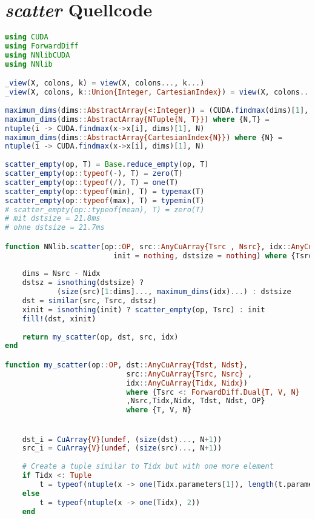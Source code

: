 \section{\textit{scatter} Quellcode}
\label{code_subfig}
\lstset{language=Julia,style=nonumbers}
\begin{lstlisting}[language=Julia]
using CUDA
using ForwardDiff
using NNlibCUDA
using NNlib

_view(X, colons, k) = view(X, colons..., k...)
_view(X, colons, k::Union{Integer, CartesianIndex}) = view(X, colons..., k)
 
maximum_dims(dims::AbstractArray{<:Integer}) = (CUDA.findmax(dims)[1], )
maximum_dims(dims::AbstractArray{NTuple{N, T}}) where {N,T} = 
ntuple(i -> CUDA.findmax(x->x[i], dims)[1], N)
maximum_dims(dims::AbstractArray{CartesianIndex{N}}) where {N} = 
ntuple(i -> CUDA.findmax(x->x[i], dims)[1], N)
 
scatter_empty(op, T) = Base.reduce_empty(op, T)
scatter_empty(op::typeof(-), T) = zero(T)
scatter_empty(op::typeof(/), T) = one(T)
scatter_empty(op::typeof(min), T) = typemax(T)
scatter_empty(op::typeof(max), T) = typemin(T)
# scatter_empty(op::typeof(mean), T) = zero(T)
# mit dstsize = 21.8ms
# ohne dstsize = 21.7ms

function NNlib.scatter(op::OP, src::AnyCuArray{Tsrc , Nsrc}, idx::AnyCuArray{Tidx, Nidx}; 
                         init = nothing, dstsize = nothing) where {Tsrc <: ForwardDiff.Dual{T, V, N},Tidx,Nsrc,Nidx,OP} where {T, V, N}
    
    dims = Nsrc - Nidx 
    dstsz = isnothing(dstsize) ? 
            (size(src)[1:dims]..., maximum_dims(idx)...) : dstsize 
    dst = similar(src, Tsrc, dstsz) 
    xinit = isnothing(init) ? scatter_empty(op, Tsrc) : init  
    fill!(dst, xinit) 
    
    return my_scatter(op, dst, src, idx)        
end

function my_scatter(op::OP, dst::AnyCuArray{Tdst, Ndst}, 
                            src::AnyCuArray{Tsrc, Nsrc} , 
                            idx::AnyCuArray{Tidx, Nidx}) 
                            where {Tsrc <: ForwardDiff.Dual{T, V, N}
                            ,Nsrc,Tidx,Nidx, Tdst, Ndst, OP} 
                            where {T, V, N}   


    dst_i = CuArray{V}(undef, (size(dst)..., N+1)) 
    src_i = CuArray{V}(undef, (size(src)..., N+1))
    
    # Create a tuple similar to Tidx but with one more element 
    if Tidx <: Tuple
        t = typeof(ntuple(x -> one(Tidx.parameters[1]), length(t.parameters)+1))
    else
        t = typeof(ntuple(x -> one(Tidx), 2))
    end


\end{lstlisting}

